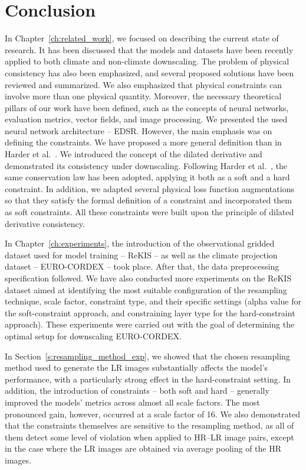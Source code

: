 \chapter{Conclusion}

In Chapter~\ref{ch:related_work}, we focused on describing the current state of research. 
It has been discussed that the models and datasets have been recently applied to both climate and non-climate downscaling. 
The problem of physical consistency has also been emphasized, and several proposed solutions have been reviewed and summarized.
We also emphasized that physical constraints can involve more than one physical quantity.
Moreover, the necessary theoretical pillars of our work have been defined, such as the concepts of neural networks, evaluation metrics, vector fields, and image processing.
We presented the used neural network architecture -- EDSR. 
However, the main emphasis was on defining the constraints.
We have proposed a more general definition than in Harder et al.~\cite{Harder2023}.
We introduced the concept of the dilated derivative and demonstrated its consistency under downscaling.
Following Harder et al.~\cite{Harder2023}, the same conservation law has been adopted, applying it both as a soft and a hard constraint.
In addition, we adapted several physical loss function augmentations so that they satisfy the formal definition of a constraint and incorporated them as soft constraints.
All these constraints were built upon the principle of dilated derivative consistency.

In Chapter~\ref{ch:experiments},  the introduction of the observational gridded dataset used for model training -- ReKIS -- as well as the climate projection dataset -- EURO-CORDEX -- took place.
After that, the data preprocessing specification followed.
We have also conducted more experiments on the ReKIS dataset aimed at identifying the most suitable configuration of the resampling technique, scale factor, constraint type, and their specific settings (alpha value for the soft-constraint approach, and constraining layer type for the hard-constraint approach).
These experiments were carried out with the goal of determining the optimal setup for downscaling EURO-CORDEX.

In Section~\ref{s:resampling_method_exp}, we showed that the chosen resampling method used to generate the LR images substantially affects the model’s performance, with a particularly strong effect in the hard-constraint setting.
In addition, the introduction of constraints -- both soft and hard -- generally improved the models’ metrics across almost all scale factors.
The most pronounced gain, however, occurred at a scale factor of 16.
We also demonstrated that the constraints themselves are sensitive to the resampling method, as all of them detect some level of violation when applied to HR–LR image pairs, except in the case where the LR images are obtained via average pooling of the HR images.

